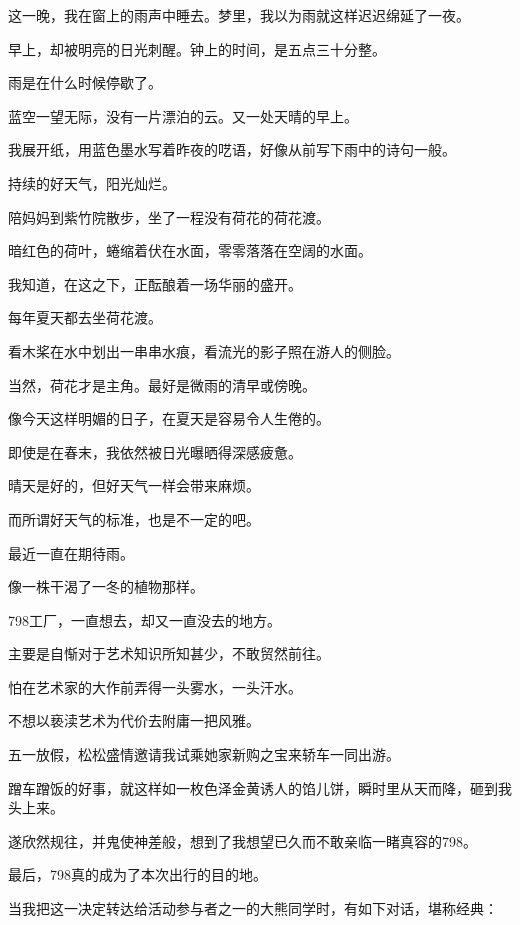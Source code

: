 \documentclass[12pt,a4paper]{article}
\begin{document}
		这一晚，我在窗上的雨声中睡去。梦里，我以为雨就这样迟迟绵延了一夜。\par
		早上，却被明亮的日光刺醒。钟上的时间，是五点三十分整。

		雨是在什么时候停歇了。

		蓝空一望无际，没有一片漂泊的云。又一处天晴的早上。\par
		我展开纸，用蓝色墨水写着昨夜的呓语，好像从前写下雨中的诗句一般。

	\endwriting



		持续的好天气，阳光灿烂。\par
		陪妈妈到紫竹院散步，坐了一程没有荷花的荷花渡。\par
		暗红色的荷叶，蜷缩着伏在水面，零零落落在空阔的水面。\par
		我知道，在这之下，正酝酿着一场华丽的盛开。\par
		每年夏天都去坐荷花渡。\par
		看木桨在水中划出一串串水痕，看流光的影子照在游人的侧脸。\par
		当然，荷花才是主角。最好是微雨的清早或傍晚。\par
		像今天这样明媚的日子，在夏天是容易令人生倦的。\par
		即使是在春末，我依然被日光曝晒得深感疲惫。\par
		晴天是好的，但好天气一样会带来麻烦。\par
		而所谓好天气的标准，也是不一定的吧。\par
		最近一直在期待雨。\par
		像一株干渴了一冬的植物那样。

	\endwriting



		798工厂，一直想去，却又一直没去的地方。\par
		主要是自惭对于艺术知识所知甚少，不敢贸然前往。\par
		怕在艺术家的大作前弄得一头雾水，一头汗水。\par
		不想以亵渎艺术为代价去附庸一把风雅。

		五一放假，松松盛情邀请我试乘她家新购之宝来轿车一同出游。\par
		蹭车蹭饭的好事，就这样如一枚色泽金黄诱人的馅儿饼，瞬时里从天而降，砸到我头上来。\par
		遂欣然规往，并鬼使神差般，想到了我想望已久而不敢亲临一睹真容的798。\par
		最后，798真的成为了本次出行的目的地。\par
		当我把这一决定转达给活动参与者之一的大熊同学时，有如下对话，堪称经典：
\end{document}
